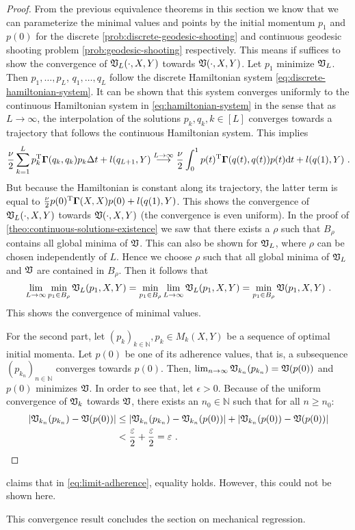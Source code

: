 \begin{proof}
	From the previous equivalence theorems in this section we know that we can parameterize the minimal values and points by the initial momentum $p_1$ and $p(0)$ for the discrete \ref{prob:discrete-geodesic-shooting} and continuous geodesic shooting problem \ref{prob:geodesic-shooting} respectively.
	This means if suffices to show the convergence of $\mathfrak{V}_L(\cdot, X, Y)$ towards $\mathfrak{V}(\cdot, X, Y)$.
	Let $p_1$ minimize $\mathfrak{V}_L$.
	Then $p_1, \ldots, p_L$, $q_1, \ldots, q_L$ follow the discrete Hamiltonian system \ref{eq:discrete-hamiltonian-system}.
	It can be shown that this system converges uniformly to the continuous Hamiltonian system in \cref{eq:hamiltonian-system} in the sense that as $L \rightarrow \infty$, the interpolation of the solutions $p_k, q_k, k \in [L]$ converges towards a trajectory that follows the continuous Hamiltonian system.
	This implies
	\begin{equation}
		\frac{\nu}{2} \sum_{k=1}^L p_k^{\mathrm{T}} \mathbf{\Gamma}(q_k, q_k) p_k \Delta t + l(q_{L+1}, Y) 
		\stackrel{L \rightarrow \infty}{\longrightarrow} \frac{\nu}{2} \int_{0}^{1} p(t)^{\mathrm{T}} \mathbf{\Gamma}(q(t), q(t)) p(t) \mathrm{d} t + l(q(1), Y) \ . 
	\end{equation}
	But because the Hamiltonian is constant along its trajectory, the latter term is equal to $\frac{\nu}{2} p(0)^{\mathrm{T}} \mathbf{\Gamma}(X, X) p(0) + l(q(1), Y)$.
	This shows the convergence of $\mathfrak{V}_L(\cdot, X, Y)$ towards $\mathfrak{V}(\cdot, X, Y)$ (the convergence is even uniform).
	In the proof of \cref{theo:continuous-solutions-existence} we saw that there exists a $\rho$ such that $B_\rho$ contains all global minima of $\mathfrak{V}$.
	This can also be shown for $\mathfrak{V}_L$, where $\rho$ can be chosen independently of $L$.
	Hence we choose $\rho$ such that all global minima of $\mathfrak{V}_L$ and $\mathfrak{V}$ are contained in $B_\rho$.
	Then it follows that
	\begin{equation}
		\lim_{L \rightarrow \infty} \min_{p_1 \in B_\rho} \mathfrak{V}_L(p_1, X, Y) = \min_{p_1 \in B_\rho} \lim_{L \rightarrow \infty}  \mathfrak{V}_L(p_1, X, Y) = \min_{p_1 \in B_\rho} \mathfrak{V}(p_1, X, Y) \ .
	\end{equation}
	This shows the convergence of minimal values.
	
	For the second part, let $(p_k)_{k \in \mathbb{N}}, p_k \in M_k(X, Y)$ be a sequence of optimal initial momenta.
	Let $p(0)$ be one of its adherence values, that is, a subsequence $(p_{k_n})_{n \in \mathbb{N}}$ converges towards $p(0)$.
	Then, $\lim_{n\rightarrow \infty} \mathfrak{V}_{k_n}(p_{k_n}) = \mathfrak{V}(p(0))$ and $p(0)$ minimizes $\mathfrak{V}$.
	In order to see that, let $\epsilon > 0$. 
	Because of the uniform convergence of $\mathfrak{V}_k$ towards $\mathfrak{V}$, there exists an $n_0 \in \mathbb{N}$ such that for all $n \geq n_0$:
	\begin{align}
		\abs{\mathfrak{V}_{k_n}(p_{k_n}) - \mathfrak{V}(p(0))} 
		&\leq \abs{\mathfrak{V}_{k_n}(p_{k_n}) - \mathfrak{V}_{k_n}(p(0))} + \abs{\mathfrak{V}_{k_n}(p(0)) - \mathfrak{V}(p(0))}\\
		&< \frac{\varepsilon}{2} + \frac{\varepsilon}{2} = \varepsilon \ .
	\end{align}
\end{proof}

\citet{owhadi20} claims that in \cref{eq:limit-adherence}, equality holds.
However, this could not be shown here.

This convergence result concludes the section on mechanical regression.